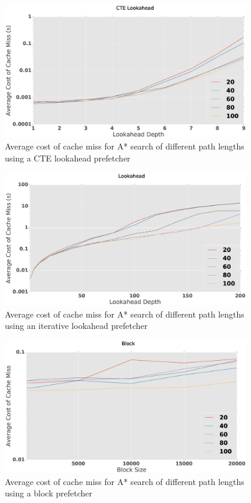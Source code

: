 \begin{figure}[htbp]
	\centering
	\includegraphics[width=0.95\textwidth]{figs/prefetch-dbcost-CTE.eps}
	\caption{Average cost of cache miss for A* search of different path lengths using a CTE lookahead prefetcher}
	\label{fig:prefetch-dbcost-CTE}
\end{figure}
\begin{figure}[htbp]
	\centering
	\includegraphics[width=0.95\textwidth]{figs/prefetch-dbcost-itr.eps}
	\caption{Average cost of cache miss for A* search of different path lengths using an iterative lookahead prefetcher}
	\label{fig:prefetch-dbcost-lookahead}
\end{figure}
\begin{figure}[htbp]
	\centering
	\includegraphics[width=0.95\textwidth]{figs/prefetch-dbcost-block.eps}
	\caption{Average cost of cache miss for A* search of different path lengths using a block prefetcher}
	\label{fig:prefetch-dbcost-block}
\end{figure}

